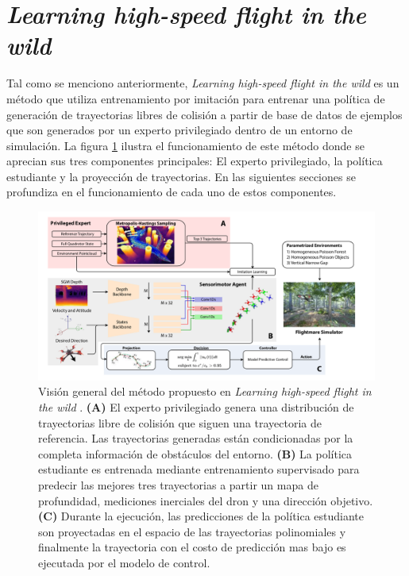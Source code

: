 \section{\textit{Learning high-speed flight in the wild}}

\label{sec::prev-agile-autonomy}

Tal como se menciono anteriormente, \textit{Learning high-speed flight in the wild} \cite{Loquercio2021} es un método que utiliza entrenamiento por imitación para entrenar una política de generación de trayectorias libres de colisión a partir de base de datos de ejemplos que son generados por un experto privilegiado dentro de un entorno de simulación. La figura \ref{fig:prev-agile-autonomy-overview} ilustra el funcionamiento de este método donde se aprecian sus tres componentes principales: El experto privilegiado, la política estudiante y la proyección de trayectorias. En las siguientes secciones se profundiza en el funcionamiento de cada uno de estos componentes.

\begin{figure}[H]
    \centering
    \includegraphics[scale=0.3]{partes/img/agile-autonomy-overview.png}
    \caption[Visión general del método propuesto en \textit{Learning high-speed flight in the wild}]{Visión general del método propuesto en \textit{Learning high-speed flight in the wild} \cite{Loquercio2021}. \textbf{(A)} El experto privilegiado genera una distribución de trayectorias libre de colisión que siguen una trayectoria de referencia. Las trayectorias generadas están condicionadas por la completa información de obstáculos del entorno. \textbf{(B)} La política estudiante es entrenada mediante entrenamiento supervisado para predecir las mejores tres trayectorias a partir un mapa de profundidad, mediciones inerciales del dron y una dirección objetivo. \textbf{(C)} Durante la ejecución, las predicciones de la política estudiante son proyectadas en el espacio de las trayectorias polinomiales y finalmente la trayectoria con el costo de predicción mas bajo es ejecutada por el modelo de control. }
    \label{fig:prev-agile-autonomy-overview}
\end{figure}

